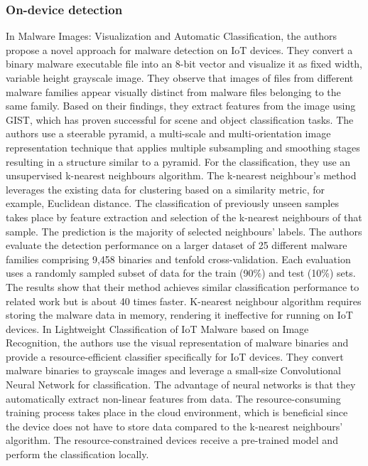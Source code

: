 \documentclass[conference, 11pt]{IEEEtran}
\begin{document}
\subsubsection{On-device detection}
In Malware Images: Visualization and Automatic Classification, the authors propose a novel approach for malware detection on IoT devices.
They convert a binary malware executable file into an 8-bit vector and visualize it as fixed width, variable height grayscale image.
They observe that images of files from different malware families appear visually distinct from malware files belonging to the same family.
Based on their findings, they extract features from the image using GIST, which has proven successful for scene and object classification tasks.
The authors use a steerable pyramid, a multi-scale and multi-orientation image representation technique that applies multiple subsampling and smoothing stages resulting in a structure similar to a pyramid.
For the classification, they use an unsupervised k-nearest neighbours algorithm.
The k-nearest neighbour's method leverages the existing data for clustering based on a similarity metric, for example, Euclidean distance.
The classification of previously unseen samples takes place by feature extraction and selection of the k-nearest neighbours of that sample.
The prediction is the majority of selected neighbours' labels.
The authors evaluate the detection performance on a larger dataset of 25 different malware families comprising 9,458 binaries and tenfold cross-validation.
Each evaluation uses a randomly sampled subset of data for the train (90\%) and test (10\%) sets.
The results show that their method achieves similar classification performance to related work but is about 40 times faster.
K-nearest neighbour algorithm requires storing the malware data in memory, rendering it ineffective for running on IoT devices.
In Lightweight Classification of IoT Malware based on Image Recognition, the authors use the visual representation of malware binaries and provide a resource-efficient classifier specifically for IoT devices.
They convert malware binaries to grayscale images and leverage a small-size Convolutional Neural Network for classification.
The advantage of neural networks is that they automatically extract non-linear features from data.
The resource-consuming training process takes place in the cloud environment, which is beneficial since the device does not have to store data compared to the k-nearest neighbours' algorithm.
The resource-constrained devices receive a pre-trained model and perform the classification locally.
\end{document}
